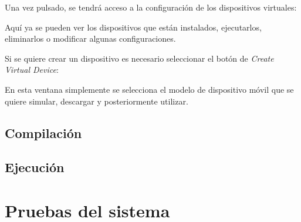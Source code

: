 Una vez pulsado, se tendrá acceso a la configuración de los dispositivos virtuales:


Aquí ya se pueden ver los dispositivos que están instalados, ejecutarlos, eliminarlos o modificar algunas configuraciones.

Si se quiere crear un dispositivo es necesario seleccionar el botón de \textit{Create Virtual Device}:


En esta ventana simplemente se selecciona el modelo de dispositivo móvil que se quiere simular, descargar y posteriormente utilizar.

\subsection{Compilación}



\subsection{Ejecución}

\section{Pruebas del sistema}
